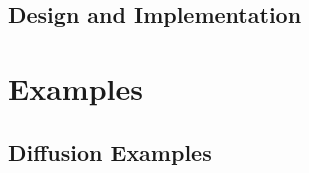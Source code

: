 \documentclass[tocAsPDFpart]{fipy}
\begin{document}




\chapter{Design and Implementation}
\label{chap:Design}





% 
% 
% 



\sloppy

\part{Examples}
\label{part:Examples}



\renewcommand{\ptctitle}{Example Contents}
\parttoc

\chapter{Diffusion Examples}


% 

% 

% 
% 

% 


\end{document}
